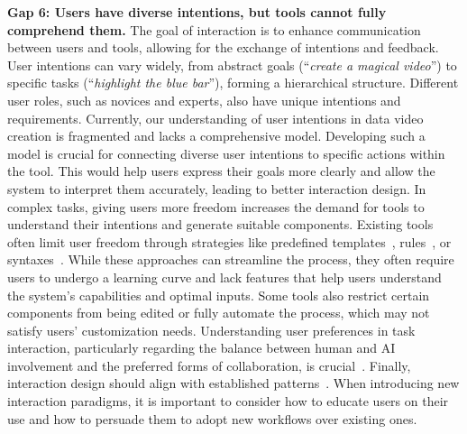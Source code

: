 \textbf{Gap 6: Users have diverse intentions, but tools cannot fully comprehend them.}
The goal of interaction is to enhance communication between users and tools, allowing for the exchange of intentions and feedback. 
User intentions can vary widely, from abstract goals (\eg ``\textit{create a magical video}'') to specific tasks (\eg ``\textit{highlight the blue bar}''), forming a hierarchical structure. 
Different user roles, such as novices and experts, also have unique intentions and requirements.
Currently, our understanding of user intentions in data video creation is fragmented and lacks a comprehensive model. Developing such a model is crucial for connecting diverse user intentions to specific actions within the tool. This would help users express their goals more clearly and allow the system to interpret them accurately, leading to better interaction design.
In complex tasks, giving users more freedom increases the demand for tools to understand their intentions and generate suitable components.
Existing tools often limit user freedom through strategies like predefined templates~\cite{Amini2017, wonderflow}, rules~\cite{Li2023b, Wang2021d}, or syntaxes~\cite{Ge2020, Zong2022}. While these approaches can streamline the process, they often require users to undergo a learning curve and lack features that help users understand the system's capabilities and optimal inputs. 
Some tools also restrict certain components from being edited or fully automate the process, which may not satisfy users' customization needs.
Understanding user preferences in task interaction, particularly regarding the balance between human and AI involvement and the preferred forms of collaboration, is crucial~\cite{Li2023a}. 
Finally, interaction design should align with established patterns~\cite{nielsen1999designing}. When introducing new interaction paradigms, it is important to consider how to educate users on their use and how to persuade them to adopt new workflows over existing ones.




